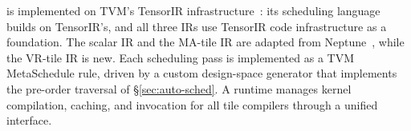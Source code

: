 \NAME{} is implemented on TVM's TensorIR infrastructure~\cite{tvm}:
its scheduling language builds on TensorIR's, and all three IRs use TensorIR code
infrastructure as a foundation.
The scalar IR and the MA-tile IR are adapted from Neptune~\cite{neptune},
while the VR-tile IR is new.
Each scheduling pass is implemented as a TVM MetaSchedule rule, driven by a custom
design-space generator that implements the pre-order traversal of \S\ref{sec:auto-sched}.
A runtime manages kernel compilation, caching, and invocation for all tile compilers
through a unified interface.

%
